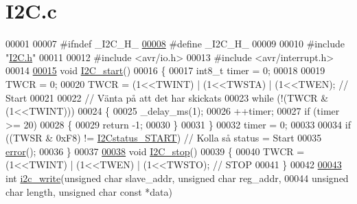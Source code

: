 \hypertarget{_i2_c_8c_source}{}\section{I2\+C.\+c}
\label{_i2_c_8c_source}

\begin{DoxyCode}
00001 
00007 \textcolor{preprocessor}{#ifndef \_I2C\_H\_}
\hypertarget{_i2_c_8c_source.tex_l00008}{}\hyperlink{_i2_c_8c_a9dcbbd7906a2df6cfb055ff82ff38d33}{00008} \textcolor{preprocessor}{#define \_I2C\_H\_}
00009 
00010 \textcolor{preprocessor}{#include "\hyperlink{_i2_c_8h}{I2C.h}"}
00011 
00012 \textcolor{preprocessor}{#include <avr/io.h>}
00013 \textcolor{preprocessor}{#include <avr/interrupt.h>}
00014 
\hypertarget{_i2_c_8c_source.tex_l00015}{}\hyperlink{_i2_c_8h_a263c74ce484e3680c05a9118707fadb7}{00015} \textcolor{keywordtype}{void} \hyperlink{_i2_c_8c_a263c74ce484e3680c05a9118707fadb7}{I2C\_start}()
00016 \{
00017     int8\_t timer = 0;
00018 
00019     TWCR = 0;
00020     TWCR = (1<<TWINT) | (1<<TWSTA) | (1<<TWEN); \textcolor{comment}{// Start}
00021 
00022     \textcolor{comment}{// Vänta på att det har skickats}
00023     \textcolor{keywordflow}{while} (!(TWCR & (1<<TWINT)))
00024     \{
00025         \_delay\_ms(1);
00026         ++timer;
00027         \textcolor{keywordflow}{if} (timer >= 20)
00028         \{
00029             \textcolor{keywordflow}{return} -1;
00030         \}
00031     \}                   
00032     timer = 0;
00033 
00034     \textcolor{keywordflow}{if} ((TWSR & 0xF8) != \hyperlink{_i2_c_8h_ae106ed126eff0ffa33378daacfbbcdb7}{I2Cstatus\_START})    \textcolor{comment}{// Kolla så status = Start}
00035     \hyperlink{_i2_c_8c_ad1a5ba420409525ff5ab1be86ac5e526}{error}();
00036 \}
00037 
\hypertarget{_i2_c_8c_source.tex_l00038}{}\hyperlink{_i2_c_8h_af8dcc1bcb3e1c6c0fcdca4cf599a239b}{00038} \textcolor{keywordtype}{void} \hyperlink{_i2_c_8c_af8dcc1bcb3e1c6c0fcdca4cf599a239b}{I2C\_stop}()
00039 \{
00040     TWCR = (1<<TWINT) | (1<<TWEN) | (1<<TWSTO);     \textcolor{comment}{// STOP}
00041 \}
00042 
\hypertarget{_i2_c_8c_source.tex_l00043}{}\hyperlink{_i2_c_8h_ac0f145afe8d662af199043939f4398d6}{00043} \textcolor{keywordtype}{int} \hyperlink{_i2_c_8c_ac0f145afe8d662af199043939f4398d6}{i2c\_write}(\textcolor{keywordtype}{unsigned} \textcolor{keywordtype}{char} slave\_addr, \textcolor{keywordtype}{unsigned} \textcolor{keywordtype}{char} reg\_addr, 
00044                 \textcolor{keywordtype}{unsigned} \textcolor{keywordtype}{char} length, \textcolor{keywordtype}{unsigned} \textcolor{keywordtype}{char} \textcolor{keyword}{const} *data)

\end{DoxyCode}

